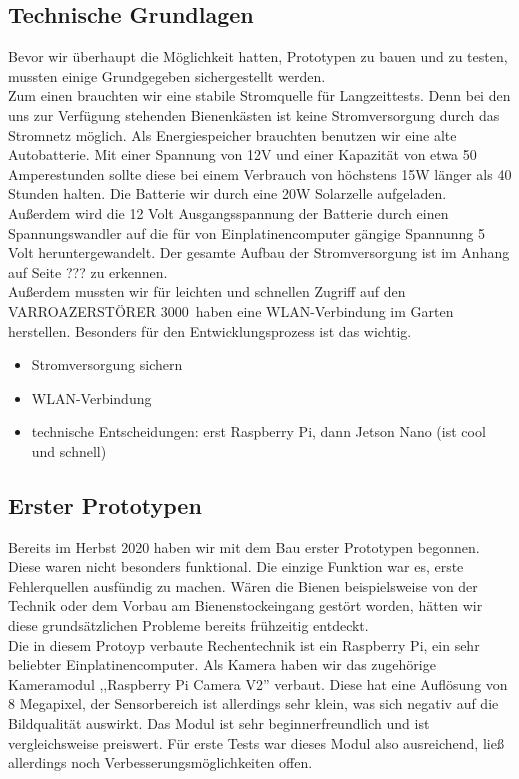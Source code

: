 \documentclass[11pt,a4paper]{article}
\newcommand{\productName}{VARROAZERSTÖRER 3000}
\begin{document}
\subsection{Technische Grundlagen}
Bevor wir überhaupt die Möglichkeit hatten, Prototypen zu bauen und zu testen, mussten einige Grundgegeben sichergestellt werden.\\
Zum einen brauchten wir eine stabile Stromquelle für Langzeittests. Denn bei den uns zur Verfügung stehenden Bienenkästen ist keine Stromversorgung durch das Stromnetz möglich. Als Energiespeicher brauchten benutzen wir eine alte Autobatterie. Mit einer Spannung von 12V und einer Kapazität von etwa 50 Amperestunden sollte diese bei einem Verbrauch von höchstens 15W länger als 40 Stunden halten. Die Batterie wir durch eine 20W Solarzelle aufgeladen. Außerdem wird die 12 Volt Ausgangsspannung der Batterie durch einen Spannungswandler auf die für von Einplatinencomputer gängige Spannunng 5 Volt heruntergewandelt. Der gesamte Aufbau der Stromversorgung ist im Anhang auf Seite ??? zu erkennen.\\
Außerdem mussten wir für leichten und schnellen Zugriff auf den \productName \ haben eine WLAN-Verbindung im Garten herstellen. Besonders für den Entwicklungsprozess ist das wichtig.

\begin{itemize}
	\item Stromversorgung sichern
	\item WLAN-Verbindung
	\item technische Entscheidungen: erst Raspberry Pi, dann Jetson Nano (ist cool und schnell)
\end{itemize}

\subsection{Erster Prototypen}
Bereits im Herbst 2020 haben wir mit dem Bau erster Prototypen begonnen. Diese waren nicht besonders funktional. Die einzige Funktion war es, erste Fehlerquellen ausfündig zu machen. Wären die Bienen beispielsweise von der Technik oder dem Vorbau am Bienenstockeingang gestört worden, hätten wir diese grundsätzlichen Probleme bereits frühzeitig entdeckt.\\
Die in diesem Protoyp verbaute Rechentechnik ist ein Raspberry Pi, ein sehr beliebter Einplatinencomputer. Als Kamera haben wir das zugehörige Kameramodul ,,Raspberry Pi Camera V2'' verbaut. Diese hat eine Auflösung von 8 Megapixel, der Sensorbereich ist allerdings sehr klein, was sich negativ auf die Bildqualität auswirkt. Das Modul ist sehr beginnerfreundlich und ist vergleichsweise preiswert. Für erste Tests war dieses Modul also ausreichend, ließ allerdings noch Verbesserungsmöglichkeiten offen.
\end{document}
